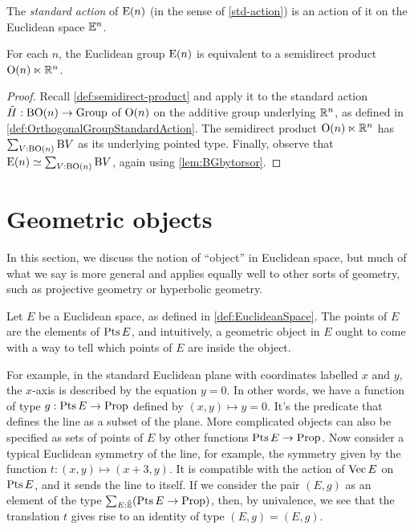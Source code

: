 The {\em standard action} of $\mathrm{E}(n)$ (in the sense of \cref{std-action}) is
an action of it on the Euclidean space $\mathbb E^n$.

\begin{theorem}\label{thm:EuclideanGroupSemidirect}
  For each $n$, the Euclidean group $\mathrm{E}(n)$ is equivalent to a semidirect
  product $\mathrm{O}(n) \ltimes \mathbb{R}^n$.
\end{theorem}

\begin{proof}
  Recall \cref{def:semidirect-product} and apply it to the standard action
  $\tilde H : \mathrm{B} \mathrm{O}(n) \to \mathrm{Group}$ of $\mathrm{O}(n)$ on the additive group
  underlying $\mathbb{R}^n$, as defined in \cref{def:OrthogonalGroupStandardAction}.
  The semidirect product $\mathrm{O}(n) \ltimes \mathbb{R}^n$ has
  $\sum_{V:\mathrm{B} \mathrm{O}(n)} \mathrm{B} V$ as its underlying pointed type.
  Finally, observe that $\mathrm{E}(n) \simeq \sum_{V:\mathrm{B} \mathrm{O}(n)} \mathrm{B} V$, again
  using \cref{lem:BGbytorsor}.
\end{proof}

\section{Geometric objects}

In this section, we discuss the notion of ``object'' in Euclidean space, but
much of what we say is more general and applies equally well to other sorts of
geometry, such as projective geometry or hyperbolic geometry.

Let $E$ be a Euclidean space, as defined in \cref{def:EuclideanSpace}.  The
points of $E$ are the elements of $\Points E$, and intuitively, a geometric
object in $E$ ought to come with a way to tell which points of $E$ are inside
the object.

For example, in the standard Euclidean plane with coordinates labelled $x$ and
$y$, the $x$-axis is described by the equation $y=0$.  In other words, we have
a function of type $g : \Points E \to \Prop$ defined by $(x,y) \mapsto y=0$.
It's the predicate that defines the line as a subset of the plane.  More
complicated objects can also be specified as sets of points of $E$ by other
functions $\Points E \to \Prop$.  Now consider a typical Euclidean symmetry of
the line, for example, the symmetry given by the function $t : (x,y) \mapsto (x+3,y)$.
It is compatible with the action of $\Vectors E$ on $\Points E$, and it sends
the line to itself.  If we consider the pair $(E,g)$ as an element of the type
$\sum_{E:\ES} (\Points E \to \Prop)$, then, by univalence, we see that the
translation $t$ gives rise to an identity of type $(E,g) = (E,g)$.

